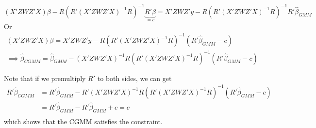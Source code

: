 \small{\[
(X'ZWZ'X)\beta-R(R'(X'ZWZ'X)^{-1}R)^{-1}\underbrace{R'\beta}_{=c}=X'ZWZ'y-R(R'(X'ZWZ'X)^{-1}R)^{-1}R'\hat{\beta}_{GMM}
\]}\normalsize
Or
\begin{gather*}
(X'ZWZ'X)\beta=X'ZWZ'y-R(R'(X'ZWZ'X)^{-1}R)^{-1}(R'\hat{\beta}_{GMM}-c)\\
\implies\hat{\beta}_{CGMM}=\hat{\beta}_{GMM}-(X'ZWZ'X)^{-1}R(R'(X'ZWZ'X)^{-1}R)^{-1}(R'\hat{\beta}_{GMM}-c)
\end{gather*}
\par 
Note that if we premultiply $R'$ to both sides, we can get
\[
\begin{aligned}
R'\hat{\beta}_{CGMM}&=R'\hat{\beta}_{GMM}-R'(X'ZWZ'X)^{-1}R(R'(X'ZWZ'X)^{-1}R)^{-1}(R'\hat{\beta}_{GMM}-c)\\
&=R'\hat{\beta}_{GMM}-R'\hat{\beta}_{GMM}+c=c\\
\end{aligned}
\]
which shows that the CGMM satisfies the constraint. 
